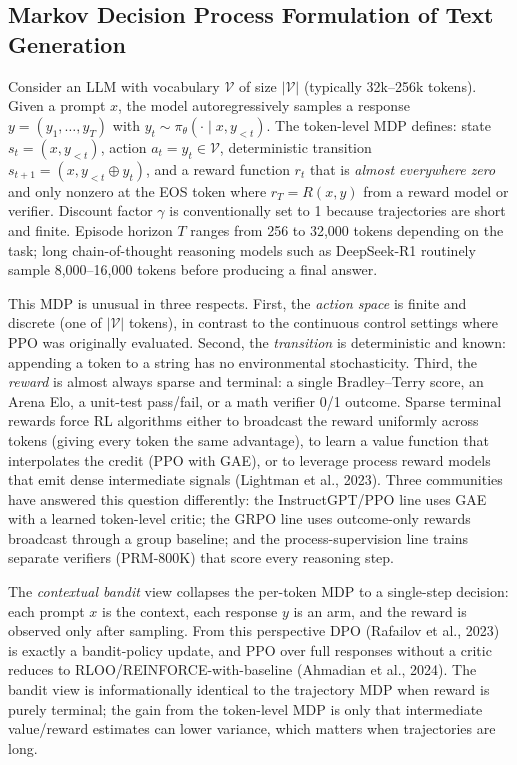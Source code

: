 \subsection{Markov Decision Process Formulation of Text Generation}\label{markov-decision-process-formulation-of-text-generation}

Consider an LLM with vocabulary \(\mathcal{V}\) of size \(|\mathcal{V}|\) (typically 32k--256k tokens). Given a prompt \(x\), the model autoregressively samples a response \(y = (y_1, \ldots, y_T)\) with \(y_t \sim \pi_\theta(\cdot \mid x, y_{<t})\). The token-level MDP defines: state \(s_t = (x, y_{<t})\), action \(a_t = y_t \in \mathcal{V}\), deterministic transition \(s_{t+1} = (x, y_{<t} \oplus y_t)\), and a reward function \(r_t\) that is \emph{almost everywhere zero} and only nonzero at the EOS token where \(r_T = R(x, y)\) from a reward model or verifier. Discount factor \(\gamma\) is conventionally set to 1 because trajectories are short and finite. Episode horizon \(T\) ranges from 256 to 32,000 tokens depending on the task; long chain-of-thought reasoning models such as DeepSeek-R1 routinely sample 8,000--16,000 tokens before producing a final answer.

This MDP is unusual in three respects. First, the \emph{action space} is finite and discrete (one of \(|\mathcal{V}|\) tokens), in contrast to the continuous control settings where PPO was originally evaluated. Second, the \emph{transition} is deterministic and known: appending a token to a string has no environmental stochasticity. Third, the \emph{reward} is almost always sparse and terminal: a single Bradley--Terry score, an Arena Elo, a unit-test pass/fail, or a math verifier 0/1 outcome. Sparse terminal rewards force RL algorithms either to broadcast the reward uniformly across tokens (giving every token the same advantage), to learn a value function that interpolates the credit (PPO with GAE), or to leverage process reward models that emit dense intermediate signals (Lightman et al., 2023). Three communities have answered this question differently: the InstructGPT/PPO line uses GAE with a learned token-level critic; the GRPO line uses outcome-only rewards broadcast through a group baseline; and the process-supervision line trains separate verifiers (PRM-800K) that score every reasoning step.

The \emph{contextual bandit} view collapses the per-token MDP to a single-step decision: each prompt \(x\) is the context, each response \(y\) is an arm, and the reward is observed only after sampling. From this perspective DPO (Rafailov et al., 2023) is exactly a bandit-policy update, and PPO over full responses without a critic reduces to RLOO/REINFORCE-with-baseline (Ahmadian et al., 2024). The bandit view is informationally identical to the trajectory MDP when reward is purely terminal; the gain from the token-level MDP is only that intermediate value/reward estimates can lower variance, which matters when trajectories are long.

